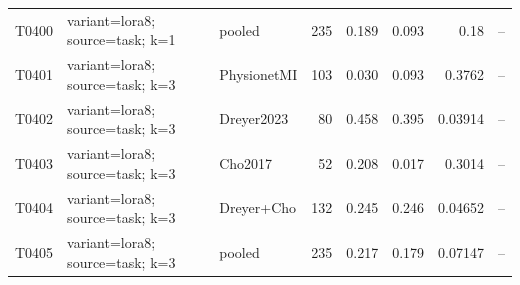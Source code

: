 \begin{longtable}{p{.45in}p{2.6in}p{.75in}rrrrr}
T0400 & variant=lora8; source=task; k=1 & pooled & 235 & 0.189 & 0.093 & 0.18 & -- \\
T0401 & variant=lora8; source=task; k=3 & PhysionetMI & 103 & 0.030 & 0.093 & 0.3762 & -- \\
T0402 & variant=lora8; source=task; k=3 & Dreyer2023 & 80 & 0.458 & 0.395 & 0.03914 & -- \\
T0403 & variant=lora8; source=task; k=3 & Cho2017 & 52 & 0.208 & 0.017 & 0.3014 & -- \\
T0404 & variant=lora8; source=task; k=3 & Dreyer+Cho & 132 & 0.245 & 0.246 & 0.04652 & -- \\
T0405 & variant=lora8; source=task; k=3 & pooled & 235 & 0.217 & 0.179 & 0.07147 & -- \\
\bottomrule
\end{longtable}

